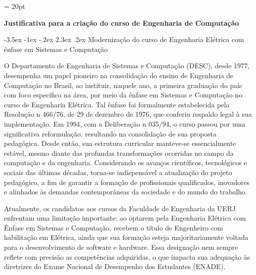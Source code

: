 \documentclass[12pt,a4paper]{article}
\makeatletter
\renewcommand{\section}{\@startsection{section}{1}{\z@}%
      {-3.5ex \@plus -1ex \@minus -.2ex}%
      {2.3ex \@plus.2ex}%
      {\normalfont\normalsize\bfseries}}
\makeatother
\begin{document}
\thispagestyle{firstpage} %
\headsep = 20pt
\setlength{\tabcolsep}{5pt} %
\vspace*{2.0cm}

\pagestyle{plain} %

\begin{center}
  \textbf{\large Justificativa para a criação do curso de Engenharia de Computação} \\
\end{center}
\small
\section{Modernização do curso de Engenharia Elétrica com ênfase em Sistemas e Computação}

O Departamento de Engenharia de Sistemas e Computação (DESC), desde 1977, desempenha um papel pioneiro na consolidação do ensino de Engenharia de Computação no Brasil, ao instituir, naquele ano, a primeira graduação do país com foco específico na área, por meio da ênfase em Sistemas e Computação no curso de Engenharia Elétrica. Tal ênfase foi formalmente estabelecida pela Resolução n\textordmasculine{} 466/76, de 29 de dezembro de 1976, que conferiu respaldo legal à sua implementação. Em 1994, com a Deliberação n\textordmasculine{} 035/94, o curso passou por uma significativa reformulação, resultando na consolidação de sua proposta pedagógica. Desde então, sua estrutura curricular manteve-se essencialmente estável, mesmo diante das profundas transformações ocorridas no campo da computação e da engenharia. Considerando os avanços científicos, tecnológicos e sociais das últimas décadas, torna-se indispensável a atualização do projeto pedagógico, a fim de garantir a formação de profissionais qualificados, inovadores e alinhados às demandas contemporâneas da sociedade e do mundo do trabalho.

Atualmente, os candidatos aos cursos da Faculdade de Engenharia da UERJ enfrentam uma limitação importante: ao optarem pela Engenharia Elétrica com Ênfase em Sistemas e Computação, recebem o título de Engenheiro com habilitação em Elétrica, ainda que sua formação esteja majoritariamente voltada para o desenvolvimento de software e hardware. Essa designação nem sempre reflete com precisão as competências adquiridas, o que impacta sua adequação às diretrizes do Exame Nacional de Desempenho dos Estudantes (ENADE).
\end{document}
